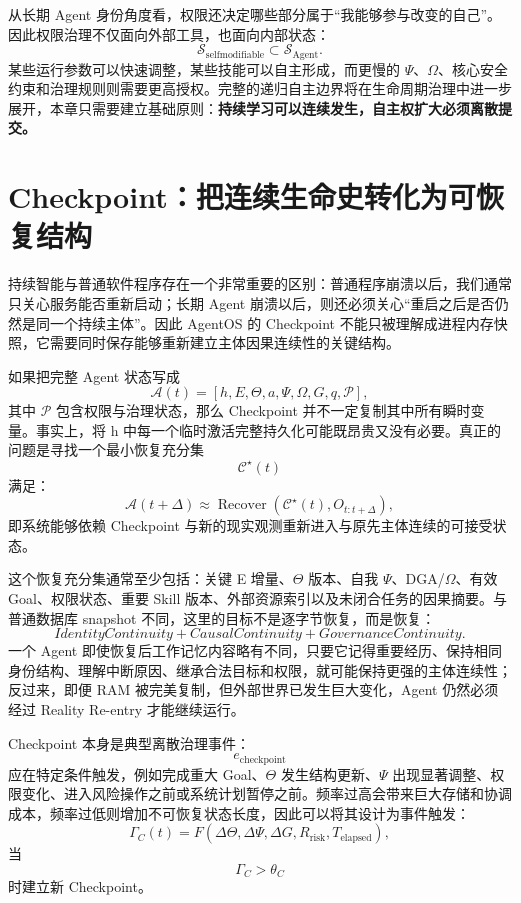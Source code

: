从长期 Agent 身份角度看，权限还决定哪些部分属于“我能够参与改变的自己”。因此权限治理不仅面向外部工具，也面向内部状态：
\[
\mathcal S_{\mathrm{selfmodifiable}}
\subset
\mathcal S_{\mathrm{Agent}}.
\]
某些运行参数可以快速调整，某些技能可以自主形成，而更慢的 \(\Psi\)、\(\Omega\)、核心安全约束和治理规则则需要更高授权。完整的递归自主边界将在生命周期治理中进一步展开，本章只需要建立基础原则：\textbf{持续学习可以连续发生，自主权扩大必须离散提交。}

\section{Checkpoint：把连续生命史转化为可恢复结构}

持续智能与普通软件程序存在一个非常重要的区别：普通程序崩溃以后，我们通常只关心服务能否重新启动；长期 Agent 崩溃以后，则还必须关心“重启之后是否仍然是同一个持续主体”。因此 AgentOS 的 Checkpoint 不能只被理解成进程内存快照，它需要同时保存能够重新建立主体因果连续性的关键结构。

如果把完整 Agent 状态写成
\[
\mathcal A(t)
=
[
h,
E,
\Theta,
a,
\Psi,
\Omega,
G,
q,
\mathcal P
],
\]
其中 \(\mathcal P\) 包含权限与治理状态，那么 Checkpoint 并不一定复制其中所有瞬时变量。事实上，将 h 中每一个临时激活完整持久化可能既昂贵又没有必要。真正的问题是寻找一个最小恢复充分集
\[
\mathcal C^\star(t)
\]
满足：
\[
\mathcal A(t+\Delta)
\approx
\operatorname{Recover}
\left(
\mathcal C^\star(t),
O_{t:t+\Delta}
\right),
\]
即系统能够依赖 Checkpoint 与新的现实观测重新进入与原先主体连续的可接受状态。

这个恢复充分集通常至少包括：关键 E 增量、\(\Theta\) 版本、自我 \(\Psi\)、DGA/\(\Omega\)、有效 Goal、权限状态、重要 Skill 版本、外部资源索引以及未闭合任务的因果摘要。与普通数据库 snapshot 不同，这里的目标不是逐字节恢复，而是恢复：
\[
\boxed{
IdentityContinuity
+
CausalContinuity
+
GovernanceContinuity.
}
\]
一个 Agent 即使恢复后工作记忆内容略有不同，只要它记得重要经历、保持相同身份结构、理解中断原因、继承合法目标和权限，就可能保持更强的主体连续性；反过来，即便 RAM 被完美复制，但外部世界已发生巨大变化，Agent 仍然必须经过 Reality Re-entry 才能继续运行。

Checkpoint 本身是典型离散治理事件：
\[
e_{\mathrm{checkpoint}}
\]
应在特定条件触发，例如完成重大 Goal、\(\Theta\) 发生结构更新、\(\Psi\) 出现显著调整、权限变化、进入风险操作之前或系统计划暂停之前。频率过高会带来巨大存储和协调成本，频率过低则增加不可恢复状态长度，因此可以将其设计为事件触发：
\[
\Gamma_C(t)
=
F(
\Delta\Theta,
\Delta\Psi,
\Delta G,
R_{\mathrm{risk}},
T_{\mathrm{elapsed}}
),
\]
当
\[
\Gamma_C>\theta_C
\]
时建立新 Checkpoint。

